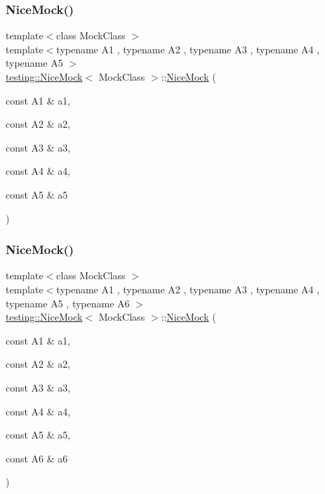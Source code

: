 \subsubsection{\texorpdfstring{Nice\+Mock()}{NiceMock()}\hspace{0.1cm}{\footnotesize\ttfamily [6/11]}}
{\footnotesize\ttfamily template$<$class Mock\+Class $>$ \\
template$<$typename A1 , typename A2 , typename A3 , typename A4 , typename A5 $>$ \\
\hyperlink{classtesting_1_1_nice_mock}{testing\+::\+Nice\+Mock}$<$ Mock\+Class $>$\+::\hyperlink{classtesting_1_1_nice_mock}{Nice\+Mock} (\begin{DoxyParamCaption}\item[{const A1 \&}]{a1,  }\item[{const A2 \&}]{a2,  }\item[{const A3 \&}]{a3,  }\item[{const A4 \&}]{a4,  }\item[{const A5 \&}]{a5 }\end{DoxyParamCaption})\hspace{0.3cm}{\ttfamily [inline]}}

\mbox{\label{classtesting_1_1_nice_mock_a156d0fce85ac08abffdf4aa0c3975f81}} 
\subsubsection{\texorpdfstring{Nice\+Mock()}{NiceMock()}\hspace{0.1cm}{\footnotesize\ttfamily [7/11]}}
{\footnotesize\ttfamily template$<$class Mock\+Class $>$ \\
template$<$typename A1 , typename A2 , typename A3 , typename A4 , typename A5 , typename A6 $>$ \\
\hyperlink{classtesting_1_1_nice_mock}{testing\+::\+Nice\+Mock}$<$ Mock\+Class $>$\+::\hyperlink{classtesting_1_1_nice_mock}{Nice\+Mock} (\begin{DoxyParamCaption}\item[{const A1 \&}]{a1,  }\item[{const A2 \&}]{a2,  }\item[{const A3 \&}]{a3,  }\item[{const A4 \&}]{a4,  }\item[{const A5 \&}]{a5,  }\item[{const A6 \&}]{a6 }\end{DoxyParamCaption})\hspace{0.3cm}{\ttfamily [inline]}}

